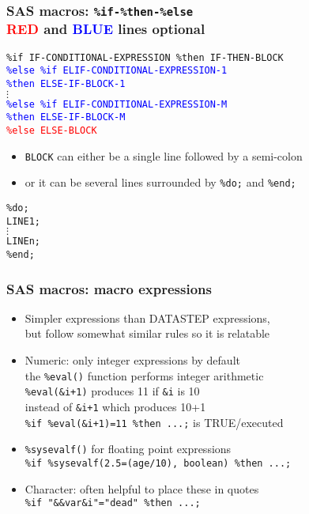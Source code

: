 \documentclass[11pt,pdftex,dvipsnames,usenames,helvetica]{beamer}
\begin{document}
\begin{frame}
\frametitle{SAS macros: {\tt \%if-\%then-\%else}\\ 
\textcolor{red}{RED} and 
\textcolor{blue}{BLUE} lines optional}
{\tt \%if IF-CONDITIONAL-EXPRESSION \%then IF-THEN-BLOCK \\
\textcolor{blue}{\%else \%if ELIF-CONDITIONAL-EXPRESSION-1\\
\%then ELSE-IF-BLOCK-1} \\
$\vdots$ \\
\textcolor{blue}{\%else \%if ELIF-CONDITIONAL-EXPRESSION-M\\
\%then ELSE-IF-BLOCK-M} \\
\textcolor{red}{\%else ELSE-BLOCK}}
\begin{itemize}
\item {\tt BLOCK} can either be a single line followed by a semi-colon
\item or it can be several lines surrounded by {\tt \%do;} and {\tt \%end;}\\
\end{itemize}
{\tt \%do;\\ \qquad LINE1;\\ \qquad $\vdots$\\ \qquad LINEn;\\ \%end;}
\end{frame}

\begin{frame}
\frametitle{SAS macros: macro expressions}
\begin{itemize}
\item Simpler expressions than DATASTEP expressions,\\
but follow somewhat similar rules so it is relatable
\item Numeric: only integer expressions by default\\
the {\tt \%eval()} function performs integer arithmetic\\
{\tt \%eval(\&i+1)} produces 11 if {\tt \&i} is 10\\
instead of {\tt \&i+1} which produces 10+1\\
{\tt \%if \%eval(\&i+1)=11 \%then ...;} is TRUE/executed
\item {\tt \%sysevalf()} for floating point expressions\\
{\tt \%if \%sysevalf(2.5=(age/10), boolean) \%then ...;}
\item Character: often helpful to place these in quotes\\
{\tt \%if "\&\&var\&i"="dead" \%then ...;}
\end{itemize}
\end{frame}
\end{document}
